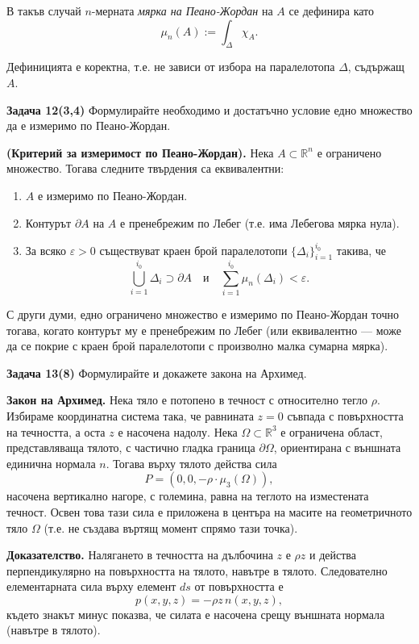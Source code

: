 \documentclass[10pt]{article}
\begin{document}
В такъв случай $n$-мерната \textit{мярка на Пеано-Жордан} на $A$ се дефинира като
\[
\mu_n(A) := \int_{\Delta} \chi_A.
\]

Дефиницията е коректна, т.е. не зависи от избора на паралелотопа $\Delta$, съдържащ $A$.


\textbf{Задача 12(3,4) }Формулирайте необходимо и достатъчно условие едно множество да е измеримо по Пеано-Жордан. 

\textbf{(Критерий за измеримост по Пеано-Жордан).} 
Нека $A \subset \mathbb{R}^n$ е ограничено множество. Тогава следните твърдения са еквивалентни:

\begin{enumerate}
    \item[(а)] $A$ е измеримо по Пеано-Жордан.
    
    \item[(б)] Контурът $\partial A$ на $A$ е пренебрежим по Лебег (т.е. има Лебегова мярка нула).
    
    \item[(в)] За всяко $\varepsilon > 0$ съществуват краен брой паралелотопи $\{\Delta_i\}_{i=1}^{i_0}$ такива, че
    \[
    \bigcup_{i=1}^{i_0} \Delta_i \supset \partial A \quad \text{и} \quad \sum_{i=1}^{i_0} \mu_n(\Delta_i) < \varepsilon.
    \]
\end{enumerate}

С други думи, едно ограничено множество е измеримо по Пеано-Жордан точно тогава, когато контурът му е пренебрежим по Лебег (или еквивалентно — може да се покрие с краен брой паралелотопи с произволно малка сумарна мярка).


\textbf{Задача 13(8) }Формулирайте и докажете закона на Архимед. 

\textbf{Закон на Архимед.} 
Нека тяло е потопено в течност с относително тегло $\rho$. Избираме координатна система така, че равнината $z = 0$ съвпада с повърхността на течността, а оста $z$ е насочена надолу. Нека $\Omega \subset \mathbb{R}^3$ е ограничена област, представляваща тялото, с частично гладка граница $\partial\Omega$, ориентирана с външната единична нормала $n$. Тогава върху тялото действа сила
\[
P = (0,0, -\rho \cdot \mu_3(\Omega)),
\]
насочена вертикално нагоре, с големина, равна на теглото на изместената течност. Освен това тази сила е приложена в центъра на масите на геометричното тяло $\Omega$ (т.е. не създава въртящ момент спрямо тази точка).

\textbf{Доказателство.} 
Налягането в течността на дълбочина $z$ е $\rho z$ и действа перпендикулярно на повърхността на тялото, навътре в тялото. Следователно елементарната сила върху елемент $ds$ от повърхността е
\[
p(x,y,z) = -\rho z \, n(x,y,z),
\]
където знакът минус показва, че силата е насочена срещу външната нормала (навътре в тялото).
\end{document}
